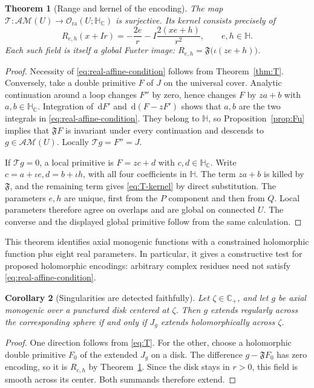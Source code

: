 \documentclass[11pt,a4paper]{article}
\numberwithin{equation}{section}
\newtheorem{theorem}{Theorem}[section]
\newtheorem{corollary}[theorem]{Corollary}
\theoremstyle{definition}
\theoremstyle{remark}
\newcommand{\C}{\mathbb C}
\newcommand{\HH}{\mathbb H}
\newcommand{\HC}{\mathbb H_{\C}}
\newcommand{\Cp}{\C_+}
\newcommand{\Fu}{\mathfrak F}
\newcommand{\AM}{\mathcal{AM}}
\newcommand{\Hol}{\mathcal O}
\newcommand{\dd}{\,\mathrm d}
\newcommand{\T}{\mathcal T}
\begin{document}
\begin{theorem}[Range and kernel of the encoding]\label{thm:T-range}
The map $\T:\AM(U)\to\Hol_{\mathrm{ra}}(U;\HC)$ is surjective. Its
kernel consists precisely of
\begin{equation}\label{eq:T-kernel}
 R_{e,h}(x+Ir)=-\frac{2e}{r}-I\frac{2(xe+h)}{r^2},
 \qquad e,h\in\HH.
\end{equation}
Each such field is itself a global Fueter image:
$R_{e,h}=\Fu\bigl(\iota(ze+h)\bigr)$.
\end{theorem}
\begin{proof}
Necessity of \eqref{eq:real-affine-condition} follows from
Theorem~\ref{thm:T}. Conversely, take a double primitive $F$ of $J$ on
the universal cover. Analytic continuation around a loop changes $F''$
by zero, hence changes $F$ by $z a+b$ with $a,b\in\HC$.
Integration of $\dd F'$ and $\dd(F-zF')$ shows that $a,b$ are the two
integrals in \eqref{eq:real-affine-condition}. They belong to $\HH$, so
Proposition~\ref{prop:Fu} implies that $\Fu F$ is invariant under every
continuation and descends to $g\in\AM(U)$. Locally $\T g=F''=J$.

If $\T g=0$, a local primitive is $F=zc+d$ with $c,d\in\HC$.
Write $c=a+\iota e,d=b+\iota h$, with all four coefficients in $\HH$.
The term $za+b$ is killed by $\Fu$, and the remaining term gives
\eqref{eq:T-kernel} by direct substitution. The parameters $e,h$ are
unique, first from the $P$ component and then from $Q$. Local parameters
therefore agree on overlaps and are global on connected $U$. The converse
and the displayed global primitive follow from the same calculation.
\end{proof}

This theorem identifies axial monogenic functions with a constrained
holomorphic function plus eight real parameters. In particular, it gives
a constructive test for proposed holomorphic encodings: arbitrary complex
residues need not satisfy \eqref{eq:real-affine-condition}.

\begin{corollary}[Singularities are detected faithfully]\label{cor:T-removable}
Let $\zeta\in\Cp$, and let $g$ be axial monogenic over a punctured disk
centered at $\zeta$. Then $g$ extends regularly across the corresponding
sphere if and only if $J_g$ extends holomorphically across $\zeta$.
\end{corollary}
\begin{proof}
One direction follows from \eqref{eq:T}. For the other, choose a
holomorphic double primitive $F_0$ of the extended $J_g$ on a disk.
The difference $g-\Fu F_0$ has zero encoding, so it is $R_{e,h}$ by
Theorem~\ref{thm:T-range}. Since the disk stays in $r>0$, this field is
smooth across its center. Both summands therefore extend.
\end{proof}
\end{document}
